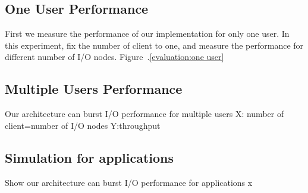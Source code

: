 \subsection{One User Performance}
First we measure the performance of our implementation for only one user.
In this experiment, fix the number of client to one, and measure the performance for different 
number of I/O nodes. Figure~.\ref{evaluation:one user}

\subsection{Multiple Users Performance}
Our architecture can burst I/O performance for multiple users
X: number of client=number of I/O nodes Y:throughput

\subsection{Simulation for applications}
Show our architecture can burst I/O performance for applications
x